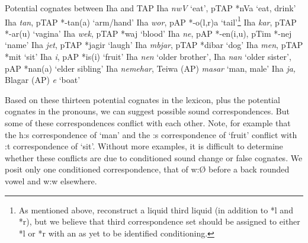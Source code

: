 \ea%
\label{ex:4:60}
\upshape 
  Potential cognates between Iha and TAP  
  \ea 
  \upshape  Iha \textit{nwV} `eat', pTAP *nVa `eat, drink'
  \ex \upshape  Iha \textit{tan}, pTAP *-tan(a) `arm/hand'
  \ex \upshape  Iha \textit{wor}, pAP *-o(l,r)a `tail'\footnote{As mentioned above,  \citet{SchapperEtAlTVtimor} reconstruct a liquid third liquid (in addition to *l and *r), but we believe that third correspondence set should be assigned to either *l or *r with an as yet to be identified conditioning. }
  \ex \upshape  Iha \textit{kar}, pTAP *-ar(u) `vagina'
  \ex \upshape  Iha \textit{wek}, pTAP *waj `blood'
  \ex \upshape  Iha \textit{ne}, pAP *-en(i,u), pTim *-nej `name'
  \ex \upshape  Iha \textit{jet}, pTAP *jagir `laugh'
  \ex \upshape Iha \textit{mbjar}, pTAP *dibar `dog'
  \ex \upshape Iha \textit{m{\pharfric}en}, pTAP *mit `sit'
  \ex \upshape Iha \textit{i{\pharfric}}, pAP *is(i) `fruit'
  \ex \upshape Iha \textit{nen }`older brother', Iha \textit{nan} `older sister', pAP *nan(a) `elder sibling'
  \ex \upshape Iha \textit{nemehar}, Teiwa (AP) \textit{masar} `man, male'
  \ex \upshape Iha \textit{ja, }Blagar (AP) \textit{{\textdyoghlig}}\textit{e} `boat'
  \z
\z
 

Based on these thirteen potential cognates in the lexicon, plus the potential cognates in the pronouns, we can suggest possible sound correspondences. But some of these correspondences conflict with each other. Note, for example that the h:s correspondence of `man' and the {\pharfric}:s correspondence of `fruit' conflict with {\pharfric}:t correspondence of `sit'. Without more examples, it is difficult to determine whether these conflicts are due to conditioned sound change or false cognates. We posit only one conditioned correspondence, that of w:{\O} before a back rounded vowel and w:w elsewhere. 





